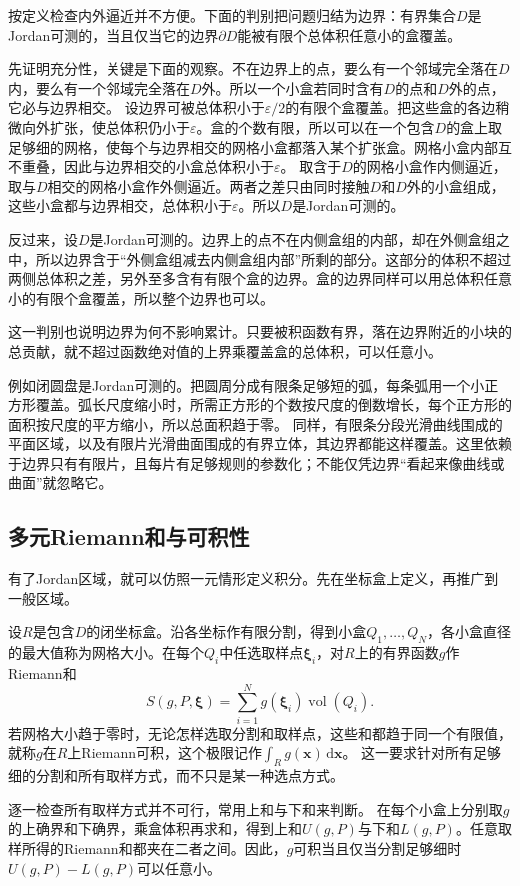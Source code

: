 按定义检查内外逼近并不方便。下面的判别把问题归结为边界：有界集合$D$是Jordan可测的，当且仅当它的边界$\partial D$能被有限个总体积任意小的盒覆盖。

先证明充分性，关键是下面的观察。不在边界上的点，要么有一个邻域完全落在$D$内，要么有一个邻域完全落在$D$外。所以一个小盒若同时含有$D$的点和$D$外的点，它必与边界相交。
设边界可被总体积小于$\varepsilon/2$的有限个盒覆盖。把这些盒的各边稍微向外扩张，使总体积仍小于$\varepsilon$。盒的个数有限，所以可以在一个包含$D$的盒上取足够细的网格，使每个与边界相交的网格小盒都落入某个扩张盒。网格小盒内部互不重叠，因此与边界相交的小盒总体积小于$\varepsilon$。
取含于$D$的网格小盒作内侧逼近，取与$D$相交的网格小盒作外侧逼近。两者之差只由同时接触$D$和$D$外的小盒组成，这些小盒都与边界相交，总体积小于$\varepsilon$。所以$D$是Jordan可测的。

反过来，设$D$是Jordan可测的。边界上的点不在内侧盒组的内部，却在外侧盒组之中，所以边界含于“外侧盒组减去内侧盒组内部”所剩的部分。这部分的体积不超过两侧总体积之差，另外至多含有有限个盒的边界。盒的边界同样可以用总体积任意小的有限个盒覆盖，所以整个边界也可以。

这一判别也说明边界为何不影响累计。只要被积函数有界，落在边界附近的小块的总贡献，就不超过函数绝对值的上界乘覆盖盒的总体积，可以任意小。

例如闭圆盘是Jordan可测的。把圆周分成有限条足够短的弧，每条弧用一个小正方形覆盖。弧长尺度缩小时，所需正方形的个数按尺度的倒数增长，每个正方形的面积按尺度的平方缩小，所以总面积趋于零。
同样，有限条分段光滑曲线围成的平面区域，以及有限片光滑曲面围成的有界立体，其边界都能这样覆盖。这里依赖于边界只有有限片，且每片有足够规则的参数化；不能仅凭边界“看起来像曲线或曲面”就忽略它。

\subsection{多元Riemann和与可积性}

有了Jordan区域，就可以仿照一元情形定义积分。先在坐标盒上定义，再推广到一般区域。

设$R$是包含$D$的闭坐标盒。沿各坐标作有限分割，得到小盒$Q_1,\ldots,Q_N$，各小盒直径的最大值称为网格大小。在每个$Q_i$中任选取样点$\bm\xi_i$，对$R$上的有界函数$g$作Riemann和
\[
 S(g,P,\bm\xi)=\sum_{i=1}^N g(\bm\xi_i)\operatorname{vol}(Q_i).
\]
若网格大小趋于零时，无论怎样选取分割和取样点，这些和都趋于同一个有限值，就称$g$在$R$上Riemann可积，这个极限记作$\int_R g(\bm x)\,\mathrm d\bm x$。
这一要求针对所有足够细的分割和所有取样方式，而不只是某一种选点方式。

逐一检查所有取样方式并不可行，常用上和与下和来判断。
在每个小盒上分别取$g$的上确界和下确界，乘盒体积再求和，得到上和$U(g,P)$与下和$L(g,P)$。任意取样所得的Riemann和都夹在二者之间。因此，$g$可积当且仅当分割足够细时$U(g,P)-L(g,P)$可以任意小。


